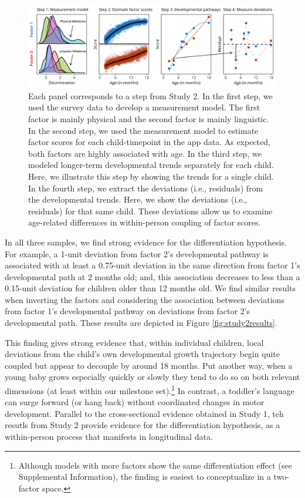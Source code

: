 \documentclass[man, floatsintext]{apa7}
\begin{document}
\begin{figure}[t!]
\centering
\includegraphics[width=1\columnwidth]{figures/bigfigure.png}
\caption{Each panel corresponds to a step from Study 2. In the first step, we used the survey data to develop a measurement model. The first factor is mainly physical and the second factor is mainly linguistic. In the second step, we used the measurement model to estimate factor scores for each child-timepoint in the app data. As expected, both factors are highly associated with age. In the third step, we modeled longer-term developmental trends separately for each child. Here, we illustrate this step by showing the trends for a single child. In the fourth step, we extract the deviations (i.e., residuals) from the developmental trends. Here, we show the deviations (i.e., residuals) for that same child. These deviations allow us to examine age-related differences
in within-person coupling of factor scores.}
\label{fig:study2}
\end{figure}

In all
three samples, we find strong evidence for the differentiation
hypothesis. For example, a 1-unit deviation from factor 2's
developmental pathway is associated with at least a 0.75-unit deviation
in the same direction from factor 1's developmental path at 2 months
old; and, this association decreases to less than a 0.15-unit deviation
for children older than 12 months old. We find similar results when
inverting the factors and considering the association between deviations
from factor 1's developmental pathway on deviations from factor 2's
developmental path. These results are depicted in Figure
\ref{fig:study2results}.

This finding gives strong evidence that, within individual children, local deviations from the child's own developmental growth trajectory begin quite coupled but appear to decouple by around 18 months. Put another way, when a young baby grows especially quickly or slowly they tend to do so on both relevant dimensions (at least within our milestone set).\footnote{Although models with more factors show the same differentiation effect (see Supplemental Information), the finding is easiest to conceptualize in a two-factor space.} In contrast, a toddler's language can surge forward (or hang back) without coordinated changes in motor development. Parallel to the cross-sectional evidence obtained in Study 1, teh resutls from Study 2 provide evidence for the differentiation hypothesis, as a within-person process that manifests in longitudinal data.
\end{document}
